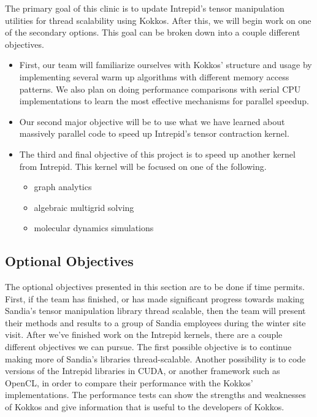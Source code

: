 \documentclass[proposal]{hmcclinic}
\begin{document}
The primary goal of this clinic is to update Intrepid's tensor
manipulation utilities for thread scalability using Kokkos. After this, we will begin work
on one of the secondary options. This goal can
be broken down into a couple different objectives. 
\begin{itemize}
    \item First, our team will familiarize ourselves with Kokkos' structure and
        usage by implementing several warm up algorithms with different memory
        access patterns.  We also plan on doing performance comparisons with
        serial CPU implementations to learn the most effective mechanisms for
        parallel speedup.
    \item Our second major objective will be to use what we have learned about
        massively parallel code to speed up Intrepid's tensor contraction
        kernel.
    \item The third and final objective of this project is to speed up another
        kernel from Intrepid.  This kernel will be focused on one of the
        following.
        \begin{itemize}
            \item graph analytics
            \item algebraic multigrid solving
            \item molecular dynamics simulations
        \end{itemize}
\end{itemize}

\subsection{Optional Objectives}

The optional objectives presented in this section are to be done if time
permits. First, if the team has finished, or has made significant progress
towards making Sandia's tensor manipulation library thread scalable, then the
team will present their methods and results to a group of Sandia employees
during the winter site visit.  After we've finished work on the Intrepid
kernels, there are a couple different objectives we can pursue.  The first
possible objective is to continue making more of Sandia's libraries
thread-scalable. Another possibility is to code versions of the Intrepid
libraries in CUDA, or another framework such as OpenCL, in order to compare
their performance with the Kokkos' implementations. The performance tests can
show the strengths and weaknesses of Kokkos and give information that is useful
to the developers of Kokkos.
\end{document}
